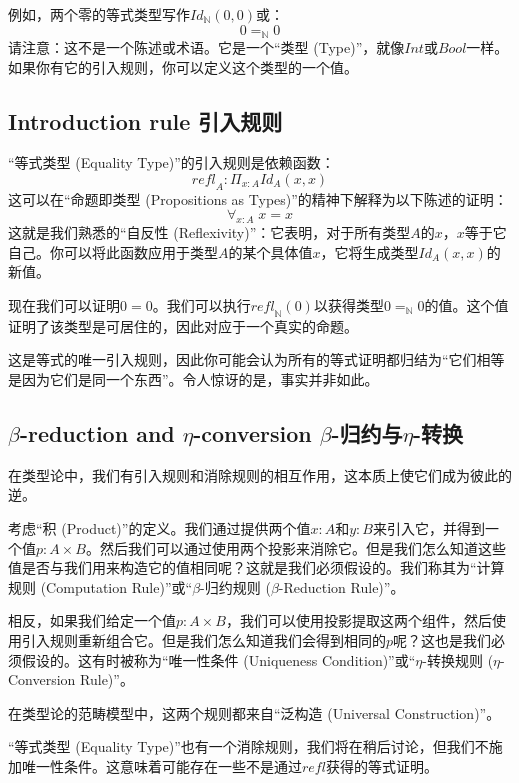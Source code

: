 \documentclass[DaoFP]{subfiles}
\begin{document}
 例如，两个零的等式类型写作$\mathit{Id}_{\mathbb{N}} (0, 0)$或：
 \[ 0 =_{\mathbb{N}} 0 \]
 请注意：这不是一个陈述或术语。它是一个“类型 (Type)”，就像$Int$或$Bool$一样。如果你有它的引入规则，你可以定义这个类型的一个值。

 \subsection{Introduction rule 引入规则}

 “等式类型 (Equality Type)”的引入规则是依赖函数：
 \[ \mathit{refl}_A \colon \Pi_{x : A}  \mathit{Id}_A  (x, x)\]
 这可以在“命题即类型 (Propositions as Types)”的精神下解释为以下陈述的证明：
 \[ \forall _{x:A} \;x = x \]
 这就是我们熟悉的“自反性 (Reflexivity)”：它表明，对于所有类型$A$的$x$，$x$等于它自己。你可以将此函数应用于类型$A$的某个具体值$x$，它将生成类型$\mathit{Id}_A  (x, x)$的新值。

 现在我们可以证明$0=0$。我们可以执行$\mathit{refl}_{\mathbb{N}} (0)$以获得类型$0 =_{\mathbb{N}} 0$的值。这个值证明了该类型是可居住的，因此对应于一个真实的命题。

 这是等式的唯一引入规则，因此你可能会认为所有的等式证明都归结为“它们相等是因为它们是同一个东西”。令人惊讶的是，事实并非如此。

 \subsection{$\beta$-reduction and $\eta$-conversion $\beta$-归约与$\eta$-转换}

 在类型论中，我们有引入规则和消除规则的相互作用，这本质上使它们成为彼此的逆。

 考虑“积 (Product)”的定义。我们通过提供两个值$x \colon A$和$y \colon B$来引入它，并得到一个值$p \colon A \times B$。然后我们可以通过使用两个投影来消除它。但是我们怎么知道这些值是否与我们用来构造它的值相同呢？这就是我们必须假设的。我们称其为“计算规则 (Computation Rule)”或“$\beta$-归约规则 ($\beta$-Reduction Rule)”。

 相反，如果我们给定一个值$p \colon A \times B$，我们可以使用投影提取这两个组件，然后使用引入规则重新组合它。但是我们怎么知道我们会得到相同的$p$呢？这也是我们必须假设的。这有时被称为“唯一性条件 (Uniqueness Condition)”或“$\eta$-转换规则 ($\eta$-Conversion Rule)”。

 在类型论的范畴模型中，这两个规则都来自“泛构造 (Universal Construction)”。

 “等式类型 (Equality Type)”也有一个消除规则，我们将在稍后讨论，但我们不施加唯一性条件。这意味着可能存在一些不是通过$\mathit{refl}$获得的等式证明。
\end{document}
